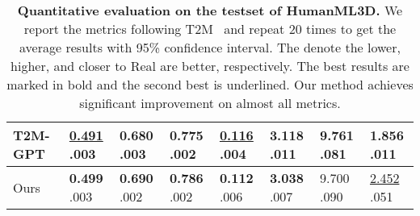 \documentclass[10pt,twocolumn,letterpaper]{article}
\begin{document}
\begin{table*}[ht]
\begin{center}
\begin{tabular}{p{2.15cm}p{1.70cm}p{1.70cm}p{1.70cm}p{1.70cm}p{1.70cm}p{1.70cm}p{1.70cm}}
T2M-GPT~\cite{zhang2023t2m} & \underline{0.491} \scriptsize  .003& 0.680  \scriptsize  .003& 0.775  \scriptsize  .002& \underline{0.116}  \scriptsize  .004&3.118  \scriptsize  .011 &9.761 \scriptsize  .081 &1.856 \scriptsize  .011\\

\hline

Ours & \textbf{0.499} \scriptsize  .003& \textbf{0.690}  \scriptsize  .002& \textbf{0.786}  \scriptsize  .002& \textbf{0.112}  \scriptsize  .006&\textbf{3.038}  \scriptsize  .007 &9.700 \scriptsize  .090 &\underline{2.452} \scriptsize  .051\\
\hline
\end{tabular}
\end{center}
\caption{\textbf{Quantitative evaluation on the testset of HumanML3D.} We report the metrics following T2M~\cite{guo2022generating} and repeat 20 times to get the average results with 95\% confidence interval. The  denote the lower, higher, and closer to Real are better, respectively. The best results are marked in bold and the second best is underlined. Our method achieves significant improvement on almost all metrics.}
\label{table:01}
\end{table*}
\end{document}
